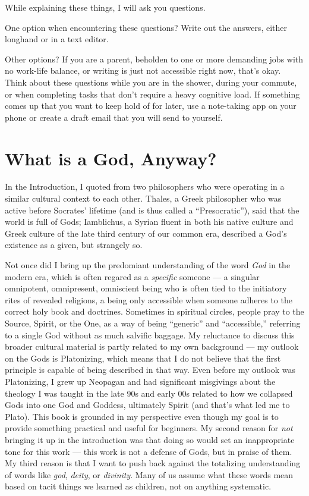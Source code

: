 \documentclass[
]{book}
\begin{document}
While explaining these things, I will ask you questions.

One option when encountering these questions? Write out the answers, either longhand or in a text editor.

Other options? If you are a parent, beholden to one or more demanding jobs with no work-life balance, or writing is just not accessible right now, that's okay. Think about these questions while you are in the shower, during your commute, or when completing tasks that don't require a heavy cognitive load. If something comes up that you want to keep hold of for later, use a note-taking app on your phone or create a draft email that you will send to yourself.

\hypertarget{what-is-a-god-anyway}{%
\section{What is a God, Anyway?}\label{what-is-a-god-anyway}}

In the Introduction, I quoted from two philosophers who were operating in a similar cultural context to each other. Thales, a Greek philosopher who was active before Socrates' lifetime (and is thus called a ``Presocratic''), said that the world is full of Gods; Iamblichus, a Syrian fluent in both his native culture and Greek culture of the late third century of our common era, described a God's existence as a given, but strangely so.

Not once did I bring up the predomiant understanding of the word \emph{God} in the modern era, which is often regared as a \emph{specific} someone --- a singular omnipotent, omnipresent, omniscient being who is often tied to the initiatory rites of revealed religions, a being only accessible when someone adheres to the correct holy book and doctrines. Sometimes in spiritual circles, people pray to the Source, Spirit, or the One, as a way of being ``generic'' and ``accessible,'' referring to a single God without as much salvific baggage. My reluctance to discuss this broader cultural material is partly related to my own background --- my outlook on the Gods is Platonizing, which means that I do not believe that the first principle is capable of being described in that way. Even before my outlook was Platonizing, I grew up Neopagan and had significant misgivings about the theology I was taught in the late 90s and early 00s related to how we collapsed Gods into one God and Goddess, ultimately Spirit (and that's what led me to Plato). This book is grounded in my perspective even though my goal is to provide something practical and useful for beginners. My second reason for \emph{not} bringing it up in the introduction was that doing so would set an inappropriate tone for this work --- this work is not a defense of Gods, but in praise of them. My third reason is that I want to push back against the totalizing understanding of words like \emph{god}, \emph{deity}, or \emph{divinity}. Many of us assume what these words mean based on tacit things we learned as children, not on anything systematic.
\end{document}
